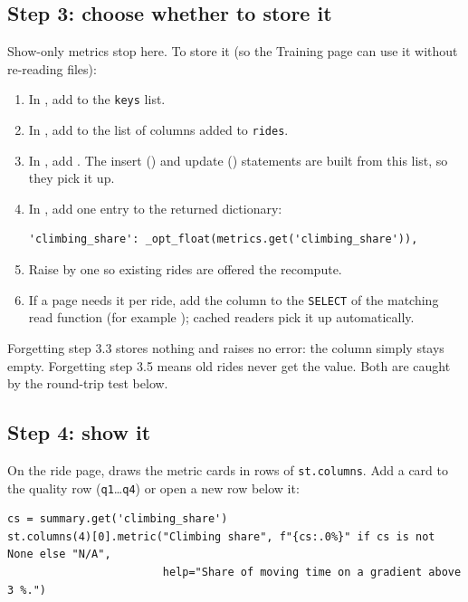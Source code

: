 \subsection*{Step 3: choose whether to store it}

Show-only metrics stop here. To store it (so the Training page can use it without re-reading files):

\begin{enumerate}
\item In , add  to the \texttt{keys} list.
\item In , add  to the list of columns added to \texttt{rides}.
\item In , add . The insert () and update
  () statements are built from this list, so they pick it up.
\item In , add one entry to the returned dictionary:
\begin{lstlisting}
'climbing_share': _opt_float(metrics.get('climbing_share')),
\end{lstlisting}
\item Raise  by one so existing rides are offered the recompute.
\item If a page needs it per ride, add the column to the \texttt{SELECT} of the matching read function
  (for example ); cached readers pick it up automatically.
\end{enumerate}

\begin{warn}
Forgetting step 3.3 stores nothing and raises no error: the column simply stays empty. Forgetting step 3.5 means old
rides never get the value. Both are caught by the round-trip test below.
\end{warn}

\subsection*{Step 4: show it}

On the ride page,  draws the metric cards in rows of \texttt{st.columns}. Add a
card to the quality row (\texttt{q1}\ldots\texttt{q4}) or open a new row below it:

\begin{lstlisting}
cs = summary.get('climbing_share')
st.columns(4)[0].metric("Climbing share", f"{cs:.0%}" if cs is not None else "N/A",
                        help="Share of moving time on a gradient above 3 %.")
\end{lstlisting}

